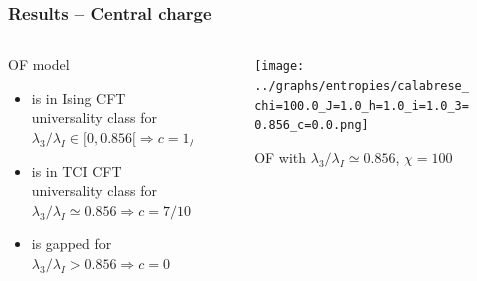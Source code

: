 \documentclass[10pt]{beamer}
\begin{document}
\begin{frame}
    \frametitle{Results -- Central charge}

    \begin{columns}
        \begin{column}{0.5\linewidth}
            \begin{block}{OF model}
                \begin{itemize}
                    \item is in Ising CFT universality class for $\lambda_3/\lambda_I \in [0, 0.856[ \Rightarrow c=1/2$
                    \pause
                    \item is in TCI CFT universality class for $\lambda_3/\lambda_I \simeq 0.856 \Rightarrow c=7/10$
                    \pause
                    \item is gapped for $\lambda_3/\lambda_I > 0.856 \Rightarrow c=0$
                \end{itemize}
            \end{block}
        \end{column}        

        \begin{column}{0.55\linewidth}
            \pause
            \begin{figure}
                \texttt{[image: ../graphs/entropies/calabrese\_chi=100.0\_J=1.0\_h=1.0\_i=1.0\_3=0.856\_c=0.0.png]}
                \caption{OF with $\lambda_3/\lambda_I \simeq 0.856$, $\chi=100$}
            \end{figure}
        \end{column}
    \end{columns}
\end{frame}
\end{document}
